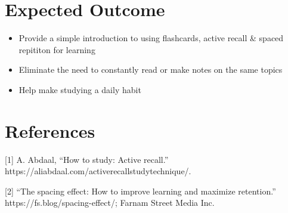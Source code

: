 \documentclass[a4paper]{article}
\begin{document}
\section{Expected Outcome}
\label{sec:org8e9eb40}
\begin{itemize}
\item Provide a simple introduction to using flashcards,  active recall \& spaced repititon for learning
\item Eliminate the need to constantly read or make notes on the same topics
\item Help make studying a daily habit
\end{itemize}
\section{References}
\label{sec:orgf2d767a}
\hypertarget{citeproc_bib_item_1}{[1] A. Abdaal, “How to study: Active recall.” https://aliabdaal.com/activerecallstudytechnique/.}

\hypertarget{citeproc_bib_item_2}{[2] “The spacing effect: How to improve learning and maximize retention.” https://fs.blog/spacing-effect/; Farnam Street Media Inc.}\bigskip
\end{document}
